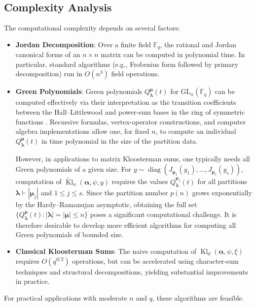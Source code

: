 \documentclass[11pt]{article}
\begin{document}
\subsection{Complexity Analysis}

The computational complexity depends on several factors:
\begin{itemize}
\item \textbf{Jordan Decomposition}: Over a finite field $\mathbb{F}_q$, the rational and Jordan canonical forms of an $n \times n$ matrix can be computed in polynomial time. In particular, standard algorithms (e.g., Frobenius form followed by primary decomposition) run in $O(n^3)$ field operations.

\item \textbf{Green Polynomials}: 
Green polynomials $Q_{\boldsymbol{\lambda}}^{\boldsymbol{\mu}}(t)$ for $\mathrm{GL}_n(\mathbb{F}_q)$
can be computed effectively via their interpretation as the transition
coefficients between the Hall--Littlewood and power-sum bases in the
ring of symmetric functions \cite{macdonald1998Symmetric}.
Recursive formulas, vertex-operator constructions, and computer algebra
implementations allow one, for fixed $n$, to compute an individual
$Q_{\boldsymbol{\lambda}}^{\boldsymbol{\mu}}(t)$ in time polynomial in the
size of the partition data.

However, in applications to matrix Kloosterman sums, one typically needs
all Green polynomials of a given size.  For
$y \sim \operatorname{diag}(J_{\boldsymbol{\mu}_1}(y_1),\ldots,
J_{\boldsymbol{\mu}_s}(y_s))$, computation of
$\widetilde{\operatorname{Kl}}_n(\boldsymbol{\alpha},\psi,y)$ requires the
values $Q_{\boldsymbol{\lambda}}^{\boldsymbol{\mu}_j}(t)$ for all
partitions $\boldsymbol{\lambda}\vdash |\boldsymbol{\mu}_j|$ and
$1\le j\le s$.  Since the partition number $p(n)$ grows exponentially by
the Hardy--Ramanujan asymptotic, obtaining the full set
$\{ Q_{\boldsymbol{\lambda}}^{\boldsymbol{\mu}}(t): |\boldsymbol{\lambda}|=|\boldsymbol{\mu}|\le n \}$
poses a significant computational challenge.  It is therefore desirable
to develop more efficient algorithms for computing all Green polynomials
of bounded size.

\item \textbf{Classical Kloosterman Sums}: 
The naive computation of $\operatorname{Kl}_d(\boldsymbol{\alpha},\psi,\xi)$
requires $O(q^{d/2})$ operations, but can be accelerated using
character-sum techniques and structural decompositions, yielding
substantial improvements in practice.
\end{itemize}
For practical applications with moderate $n$ and $q$, these algorithms are feasible.
\end{document}
